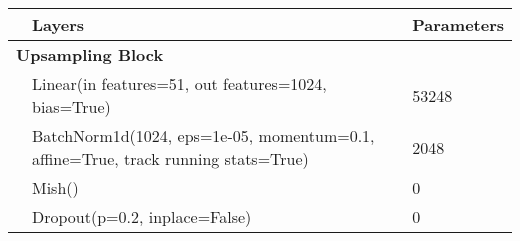 \begin{center}
    \begin{tabular}{ p{} p{}  p{}}
                                                        & \textbf{Layers}                                                                   & \textbf{Parameters} \\
        \hline
        \multicolumn{2}{l}{\textbf{Upsampling Block}}   &                                                                                                         \\

                                                        & Linear(in features=51, out features=1024, bias=True)                              & 53248               \\
                                                        & BatchNorm1d(1024, eps=1e-05, momentum=0.1, affine=True, track running stats=True) & 2048                \\
                                                        & Mish()                                                                            & 0                   \\
                                                        & Dropout(p=0.2, inplace=False)                                                     & 0                   \\


\end{tabular}
\end{center}

